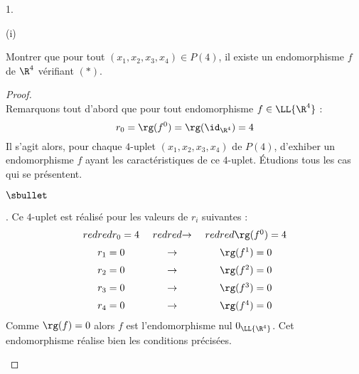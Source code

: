 \documentclass[11pt]{article}%
\begin{document}
\begin{noliste}{1.}
    \newpage


    \begin{noliste}{(i)}
      \setcounter{enumii}{2}
    \item Montrer que pour tout $(x_1,x_2,x_3,x_4) \in P(4)$, il
      existe un endomorphisme $f$ de $\R^4$ vérifiant \nolinebreak
      $(*)$.

      \begin{proof}~\\%
        Remarquons tout d'abord que pour tout endomorphisme $f \in
        \LL{\R^4}$ : 
        \[
        r_0 = \rg(f^0) = \rg(\id_{\R^4}) = 4
        \]
        Il s'agit alors, pour chaque $4$-uplet $(x_1, x_2, x_3, x_4)$
        de $P(4)$, d'exhiber un endomorphisme $f$ ayant les
        caractéristiques de ce $4$-uplet. Étudions tous les cas qui se
        présentent.
        \begin{noliste}{$\sbullet$}
        \item {}. Ce
          $4$-uplet est réalisé pour les valeurs de $r_i$ suivantes :
          \[
          \begin{array}{c@{\ \quad}c@{\ \quad}c}
            \color{red}{r_0 = 4} & \color{red}{\rightarrow} &
            \color{red}{\rg(f^0) = 4} \\[.2cm] 
            r_1 = 0 & \rightarrow & \rg(f^1) = 0 \\[.2cm]
            r_2 = 0 & \rightarrow & \rg(f^2) = 0 \\[.2cm]
            r_3 = 0 & \rightarrow & \rg(f^3) = 0 \\[.2cm]
            r_4 = 0 & \rightarrow & \rg(f^4) = 0 
          \end{array}
          \]
          Comme $\rg(f) = 0$ alors $f$ est l'endomorphisme nul
          $0_{\LL{\R^4}}$. Cet endomorphisme réalise bien les
          conditions précisées.


\end{noliste}
\end{proof}
\end{noliste}
\end{noliste}
\end{document}
